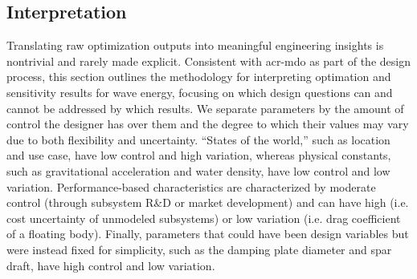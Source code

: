 \subsection{Interpretation}
Translating raw optimization outputs into meaningful engineering insights is nontrivial and rarely made explicit.
Consistent with \gls{acr-mdo} as part of the design process, this section outlines the methodology for interpreting optimation and sensitivity results for wave energy, focusing on which design questions can and cannot be addressed by which results.
We separate parameters by the amount of control the designer has over them and the degree to which their values may vary due to both flexibility and uncertainty.
``States of the world,'' such as location and use case, have low control and high variation, whereas physical constants, such as gravitational acceleration and water density, have low control and low variation.
Performance-based characteristics are characterized by moderate control (through subsystem R\&D or market development) and can have high (i.e. cost uncertainty of unmodeled subsystems) or low variation (i.e. drag coefficient of a floating body).
Finally, parameters that could have been design variables but were instead fixed for simplicity, such as the damping plate diameter and spar draft, have high control and low variation.
